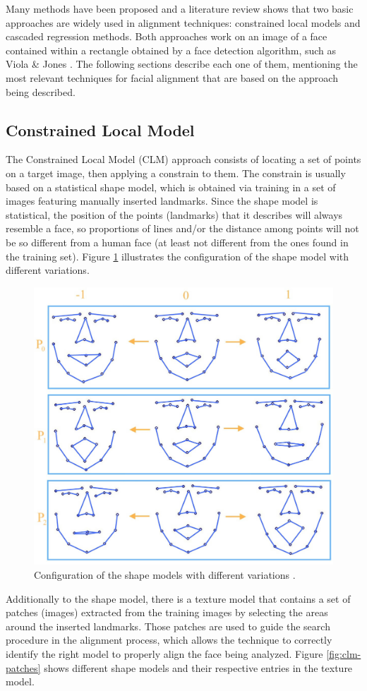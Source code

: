 Many methods have been proposed and a literature review shows that two basic approaches are widely used in alignment techniques: constrained local models and cascaded regression methods. Both approaches work on an image of a face contained within a rectangle obtained by a face detection algorithm, such as Viola \& Jones \parencite{viola2004robust}. The following sections describe each one of them, mentioning the most relevant techniques for facial alignment that are based on the approach being described.

\subsection{Constrained Local Model}

The Constrained Local Model (CLM) approach consists of locating a set of points on a target image, then applying a constrain to them. The constrain is usually based on a statistical shape model, which is obtained via training in a set of images featuring manually inserted landmarks. Since the shape model is statistical, the position of the points (landmarks) that it describes will always resemble a face, so proportions of lines and/or the distance among points will not be so different from a human face (at least not different from the ones found in the training set). Figure \ref{fig:clm-model-variation} illustrates the configuration of the shape model with different variations.

\begin{figure}[h]
    \centering
    \includegraphics[width=0.5\linewidth]{figures/clm-model-variation.jpg}
    \caption{Configuration of the shape models with different variations \parencite{yu2010facial}.}
    \label{fig:clm-model-variation}
\end{figure}

Additionally to the shape model, there is a texture model that contains a set of patches (images) extracted from the training images by selecting the areas around the inserted landmarks. Those patches are used to guide the search procedure in the alignment process, which allows the technique to correctly identify the right model to properly align the face being analyzed. Figure \ref{fig:clm-patches} shows different shape models and their respective entries in the texture model.


